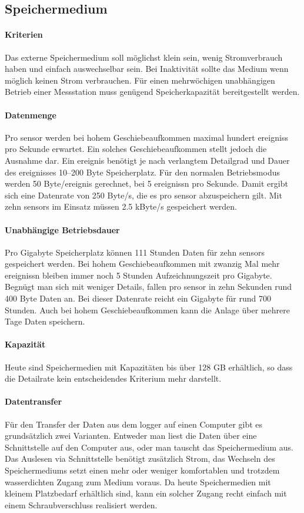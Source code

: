 \subsection{Speichermedium}
\paragraph{Kriterien} Das externe Speichermedium soll möglichst klein sein, wenig Stromverbrauch haben und einfach auswechselbar sein. Bei Inaktivität sollte das Medium wenn möglich keinen Strom verbrauchen. Für einen mehrwöchigen unabhängigen Betrieb einer Messstation muss genügend Speicherkapazität bereitgestellt werden.

\paragraph{Datenmenge} Pro \gls{sensor} werden bei hohem Geschiebeaufkommen maximal hundert \glspl{ereignis} pro Sekunde erwartet. Ein solches Geschiebeaufkommen stellt jedoch die Ausnahme dar. Ein \gls{ereignis} benötigt je nach verlangtem Detailgrad und Dauer des \gls{ereignis}ses 10--200 Byte Speicherplatz. Für den normalen Betriebsmodus werden 50 Byte/\gls{ereignis} gerechnet, bei 5 \glspl{ereignis}n pro Sekunde. Damit ergibt sich eine Datenrate von 250 Byte/s, die es pro \gls{sensor} abzuspeichern gilt. Mit zehn \glspl{sensor} im Einsatz müssen 2.5 kByte/s gespeichert werden. 

\paragraph{Unabhängige Betriebsdauer} Pro Gigabyte Speicherplatz können 111 Stunden Daten für zehn \glspl{sensor} gespeichert werden. Bei hohem Geschiebeaufkommen mit zwanzig Mal mehr \glspl{ereignis}n bleiben immer noch 5 Stunden Aufzeichnungszeit pro Gigabyte. Begnügt man sich mit weniger Details, fallen pro \gls{sensor} in zehn Sekunden rund 400 Byte Daten an. Bei dieser Datenrate reicht ein Gigabyte für rund 700 Stunden. Auch bei hohem Geschiebeaufkommen kann die Anlage über mehrere Tage Daten speichern. 

\paragraph{Kapazität} Heute sind Speichermedien mit Kapazitäten bis über 128 GB erhältlich, so dass die Detailrate kein entscheidendes Kriterium mehr darstellt.

\paragraph{Datentransfer} Für den Transfer der Daten aus dem \gls{logger} auf einen Computer gibt es grundsätzlich zwei Varianten. Entweder man liest die Daten über eine Schnittstelle auf den Computer aus, oder man tauscht das Speichermedium aus. Das Auslesen via Schnittstelle benötigt zusätzlich Strom, das Wechseln des Speichermediums setzt einen mehr oder weniger komfortablen und trotzdem wasserdichten Zugang zum Medium voraus. Da heute Speichermedien mit kleinem Platzbedarf erhältlich sind, kann ein solcher Zugang recht einfach mit einem Schraubverschluss realisiert werden.

